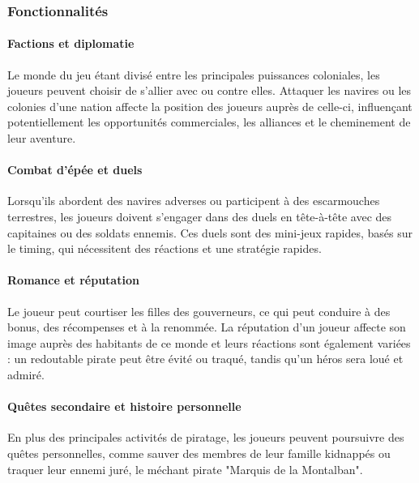 \documentclass{article}
\begin{document}
\subsubsection{Fonctionnalités}
\paragraph{Factions et diplomatie}\hfill

Le monde du jeu étant divisé entre les principales puissances coloniales, les joueurs peuvent choisir de s'allier avec ou contre elles. Attaquer les navires ou les colonies d’une nation affecte la position des joueurs auprès de celle-ci, influençant potentiellement les opportunités commerciales, les alliances et le cheminement de leur aventure.

\paragraph{Combat d’épée et duels}\hfill

Lorsqu'ils abordent des navires adverses ou participent à des escarmouches terrestres, les joueurs doivent s'engager dans des duels en tête-à-tête avec des capitaines ou des soldats ennemis. Ces duels sont des mini-jeux rapides, basés sur le timing, qui nécessitent des réactions et une stratégie rapides.

\paragraph{Romance et réputation}\hfill

Le joueur peut courtiser les filles des gouverneurs, ce qui peut conduire à des bonus, des récompenses et à la renommée. La réputation d'un joueur affecte son image auprès des habitants de ce monde et leurs réactions sont également variées : un redoutable pirate peut être évité ou traqué, tandis qu'un héros sera loué et admiré.

\paragraph{Quêtes secondaire et histoire personnelle}\hfill

En plus des principales activités de piratage, les joueurs peuvent poursuivre des quêtes personnelles, comme sauver des membres de leur famille kidnappés ou traquer leur ennemi juré, le méchant pirate "Marquis de la Montalban".
\end{document}
